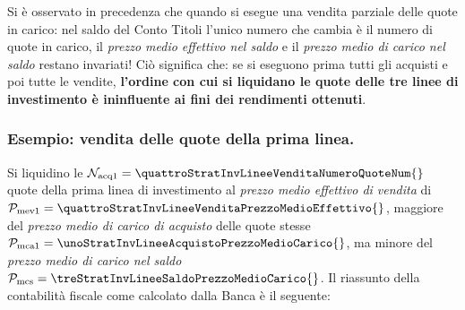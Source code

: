 \documentclass[12pt,a4paper]{article}
\newcommand{\Nacq}[1]{\mathcal{N}_{\textrm{acq}#1}}
\newcommand{\Pmev}[1]{\mathcal{P}_{\mathrm{mev}#1}}
\newcommand{\Pmc}[1]{\mathcal{P}_{\mathrm{mc}#1}}
\newcommand{\Pmca}[1]{\Pmc{\mathrm{a}#1}}
\newcommand{\Pmcs}[1]{\Pmc{\mathrm{s}#1}}
\begin{document}
Si è osservato  in precedenza che quando si  esegue una vendita parziale delle quote  in carico: nel
saldo del  Conto Titoli l'unico numero  che cambia è il  numero di quote in  carico, il \emph{prezzo
   medio effettivo nel saldo}  e il \emph{prezzo medio di carico nel  saldo} restano invariati!  Ciò
significa che: se si eseguono prima tutti gli  acquisti e poi tutte le vendite, \textbf{l'ordine con
   cui si liquidano  le quote delle tre linee  di investimento è ininfluente ai  fini dei rendimenti
   ottenuti}.


\subsubsection{Esempio: vendita delle quote della prima linea.}


Si liquidino le \(\Nacq{1} = \quattroStratInvLineeVenditaNumeroQuoteNum{}\) quote della prima linea
di      investimento      al     \emph{prezzo      medio      effettivo      di     vendita}      di
\(\Pmev{1} =  \quattroStratInvLineeVenditaPrezzoMedioEffettivo{}\), maggiore del  \emph{prezzo medio
  di           carico          di           acquisto}          delle           quote          stesse
\(\Pmca{1}  = \unoStratInvLineeAcquistoPrezzoMedioCarico{}\),  ma minore  del \emph{prezzo  medio di
  carico  nel saldo}  \(\Pmcs{} =  \treStratInvLineeSaldoPrezzoMedioCarico{}\).  Il  riassunto della
contabilità fiscale come calcolato dalla Banca è il seguente:
\end{document}

